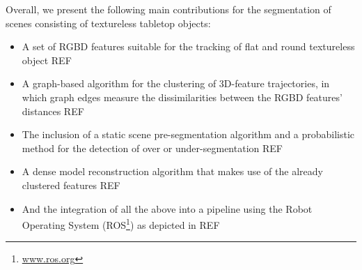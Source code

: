 Overall, we present the following main contributions for the
segmentation of scenes consisting of textureless tabletop
objects:
\begin{itemize}
\item A set of RGBD features suitable for the tracking of
  flat and round textureless object REF%
\item A graph-based algorithm  for the clustering of 3D-feature
trajectories, in which graph edges measure the dissimilarities between the RGBD
features' distances REF%
\item The inclusion of a static scene pre-segmentation algorithm
  and a probabilistic method for the detection of over or under-segmentation REF%
\item A dense model reconstruction algorithm that makes use of the already clustered features REF%
\item And the integration of all the above into a pipeline using the
  Robot Operating System (ROS\footnote{\url{www.ros.org}}) as depicted in REF%
\end{itemize}


